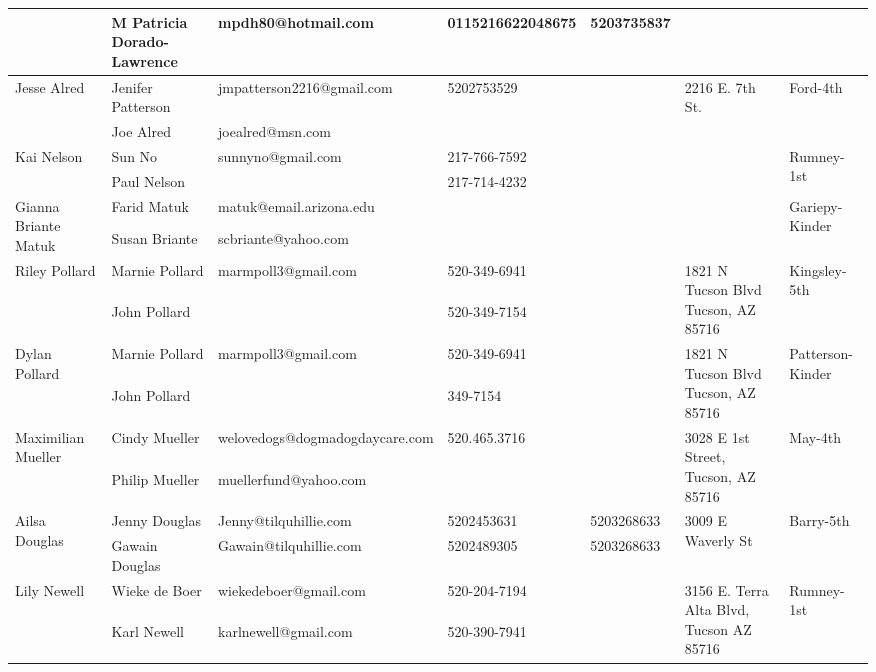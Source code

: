 \documentclass[landscape]{book}\usepackage[]{graphicx}\usepackage[]{color}
\begin{document}
\begin{longtable}{p{70pt}|p{75pt}|p{120pt}|p{60pt}|p{60pt}|p{100pt}|p{70pt}|}
 & M Patricia Dorado-Lawrence & mpdh80@hotmail.com & 0115216622048675 & 5203735837 & & \\
\hline
\multirow{2}{70pt}{Jesse Alred} & Jenifer Patterson & jmpatterson2216@gmail.com & 5202753529 &  & \multirow{2}{100pt}{2216 E. 7th St.} & \multirow{2}{70pt}{Ford-4th}\\
 & Joe Alred & joealred@msn.com &  &  & & \\
\hline
\multirow{2}{70pt}{Kai Nelson} & Sun No & sunnyno@gmail.com & 217-766-7592 &  & \multirow{2}{100pt}{} & \multirow{2}{70pt}{Rumney-1st}\\
 & Paul Nelson &  & 217-714-4232 &  & & \\
\hline
\multirow{2}{70pt}{Gianna Briante Matuk} & Farid Matuk & matuk@email.arizona.edu &  &  & \multirow{2}{100pt}{} & \multirow{2}{70pt}{Gariepy-Kinder}\\
 & Susan Briante & scbriante@yahoo.com &  &  & & \\
\hline
\multirow{2}{70pt}{Riley Pollard} & Marnie Pollard & marmpoll3@gmail.com & 520-349-6941 &  & \multirow{2}{100pt}{1821 N Tucson Blvd Tucson, AZ 85716} & \multirow{2}{70pt}{Kingsley-5th}\\
 & John Pollard &  & 520-349-7154 &  & & \\
\hline
\multirow{2}{70pt}{Dylan Pollard} & Marnie Pollard & marmpoll3@gmail.com & 520-349-6941 &  & \multirow{2}{100pt}{1821 N Tucson Blvd Tucson, AZ 85716} & \multirow{2}{70pt}{Patterson-Kinder}\\
 & John Pollard &  & 349-7154 &  & & \\
\hline
\multirow{2}{70pt}{Maximilian Mueller} & Cindy Mueller & welovedogs@dogmadogdaycare.com & 520.465.3716 &  & \multirow{2}{100pt}{3028 E 1st Street, Tucson, AZ 85716} & \multirow{2}{70pt}{May-4th}\\
 & Philip Mueller & muellerfund@yahoo.com &  &  & & \\
\hline
\multirow{2}{70pt}{Ailsa Douglas} & Jenny Douglas & Jenny@tilquhillie.com & 5202453631 & 5203268633 & \multirow{2}{100pt}{3009 E Waverly St} & \multirow{2}{70pt}{Barry-5th}\\
 & Gawain Douglas & Gawain@tilquhillie.com & 5202489305 & 5203268633 & & \\
\hline
\multirow{2}{70pt}{Lily Newell} & Wieke de Boer & wiekedeboer@gmail.com & 520-204-7194 &  & \multirow{2}{100pt}{3156 E. Terra Alta Blvd, Tucson AZ 85716} & \multirow{2}{70pt}{Rumney-1st}\\
 & Karl Newell & karlnewell@gmail.com & 520-390-7941 &  & & \\

\end{longtable}
\end{document}
